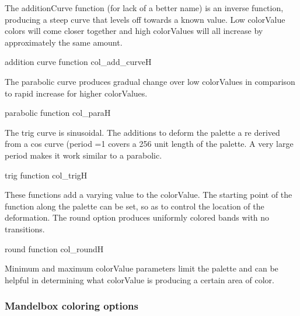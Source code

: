 The additionCurve function (for lack of a better name) is an inverse function, producing a steep curve that levels off towards a known value. Low colorValue colors will come closer together and high colorValues will all increase by approximately the same amount.

{addition curve function}
{col_add_curve}{H}

The parabolic curve produces gradual change over low colorValues in comparison to rapid increase for higher colorValues.

{parabolic function}
{col_para}{H}

The trig curve is sinusoidal. The additions to deform the palette a re derived from a cos curve (period =1 covers a 256 unit length of the palette. A very large period makes it work similar to a parabolic.

{trig function}
{col_trig}{H}

These functions add a varying value to the colorValue. The starting point of the function along the palette can be set, so as to control the location of the deformation.
The round option produces uniformly colored bands with no transitions.

{round function}
{col_round}{H}

Minimum and maximum colorValue parameters limit the palette and can be helpful in determining what colorValue is producing a certain area of color.

\subsubsection{Mandelbox coloring options}\label{materials-mandelbox}





